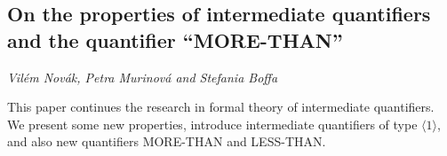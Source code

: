 \documentclass[../booklet.tex]{subfiles}
\begin{document}
\subsection[On the properties of intermediate quantifiers and the quantifier ``MORE-THAN''. {\it Vilém Novák, Petra Murinová and Stefania Boffa}]{On the properties of intermediate quantifiers and the quantifier ``MORE-THAN''}
  

\begin{center}
  {\it Vilém Novák, Petra Murinová and Stefania Boffa}
\end{center}

\vskip 0.8cm


This paper continues the research in formal theory of intermediate quantifiers. We present some new properties, introduce intermediate quantifiers of type $\langle 1\rangle$, and also new quantifiers MORE-THAN and LESS-THAN.
%
\end{document}
